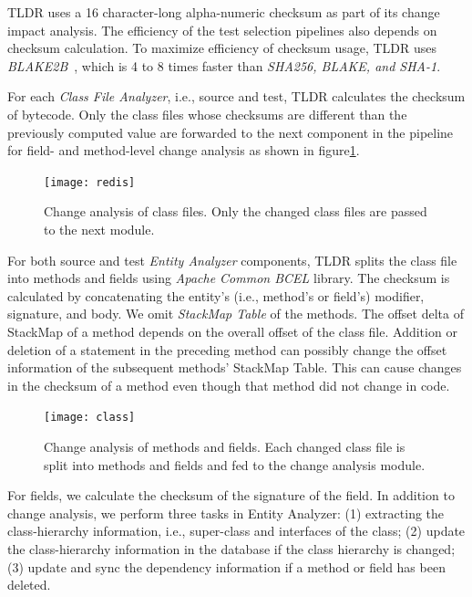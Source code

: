 TLDR uses a 16 character-long alpha-numeric checksum as part of its change impact analysis. The efficiency of the test selection pipelines also depends on checksum calculation. To maximize efficiency of checksum usage, TLDR uses \textit{BLAKE2B}~\cite{aumasson2013blake2}, which is 4 to 8 times faster than \textit{SHA256, BLAKE, and SHA-1}. 

For each \textit{Class File Analyzer}, i.e., source and test, TLDR calculates the checksum of bytecode. Only the class files whose checksums are different than the previously computed value are forwarded to the next component in the pipeline for field- and method-level change analysis as shown in figure\ref{fig:change_class}. 

\begin{figure}
\begin{center}
  \texttt{[image: redis]}
  \caption{Change analysis of class files. Only the changed class files are passed to the next module.}
  \label{fig:change_class}
\end{center}
\end{figure}

For both source and test \textit{Entity Analyzer} components, TLDR splits the class file into methods and fields using \textit{Apache Common BCEL} library. The checksum is calculated by concatenating the entity's (i.e., method's or field's) modifier, signature, and body. We omit \textit{StackMap Table} of the methods. The offset delta of StackMap of a method depends on the overall offset of the class file. Addition or deletion of a statement in the preceding method can possibly change the offset information of the subsequent methods' StackMap Table. This can cause changes in the checksum of a method even though that method did not change in code. 


\begin{figure}
\begin{center}
  \texttt{[image: class]}
  \caption{Change analysis of methods and fields. Each changed class file is split into methods and fields and fed to the change analysis module.}
  \label{fig:change_method}
\end{center}
\end{figure}


For fields, we calculate the checksum of the signature of the field. In addition to change analysis, we perform three tasks in Entity Analyzer: (1) extracting the class-hierarchy information, i.e., super-class and interfaces of the class; (2) update the class-hierarchy information in the database if the class hierarchy is changed; (3) update and sync the dependency information if a method or field has been deleted. 

